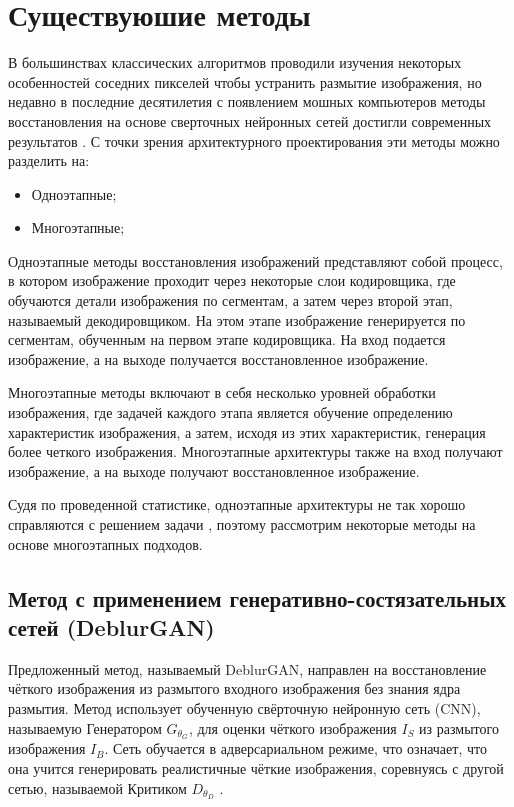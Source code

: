 \section{Существуюшие методы}

В большинствах классических алгоритмов проводили изучения некоторых особенностей соседних пикселей чтобы устранить размытие изображения, но недавно в последние десятилетия с появлением мошных компьютеров методы восстановления на основе сверточных нейронных сетей достигли современных результатов \cite{suin2020spatially}. С точки зрения архитектурного проектирования эти методы можно разделить на:
\begin{itemize}
	\item Одноэтапные;
	\item Многоэтапные;
\end{itemize}

Одноэтапные методы восстановления изображений представляют собой процесс, в котором изображение проходит через некоторые слои кодировщика, где обучаются детали изображения по сегментам, а затем через второй этап, называемый декодировщиком. На этом этапе изображение генерируется по сегментам, обученным на первом этапе кодировщика. На вход подается изображение, а на выходе получается восстановленное изображение.

Многоэтапные методы включают в себя несколько уровней обработки изображения, где задачей каждого этапа является обучение определению характеристик изображения, а затем, исходя из этих характеристик, генерация более четкого изображения. Многоэтапные архитектуры также на вход получают изображение, а на выходе получают восстановленное изображение.

Судя по проведенной статистике, одноэтапные архитектуры не так хорошо справляются с решением задачи \cite{zamir2021multi}, поэтому рассмотрим некоторые методы на основе многоэтапных подходов.

\subsection{Метод с применением генеративно-состязательных сетей (DeblurGAN)}

Предложенный метод, называемый DeblurGAN, направлен на восстановление чёткого изображения из размытого входного изображения без знания ядра размытия. Метод использует обученную свёрточную нейронную сеть (CNN), называемую Генератором \(G_{\theta_{G}}\), для оценки чёткого изображения \(I_{S}\) из размытого изображения \(I_{B}\). Сеть обучается в адверсариальном режиме, что означает, что она учится генерировать реалистичные чёткие изображения, соревнуясь с другой сетью, называемой Критиком \(D_{\theta_{D}}\) \cite{kupyn2018deblurgan}.

